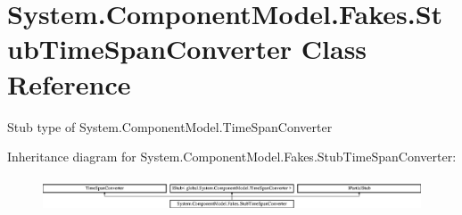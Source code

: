 \hypertarget{class_system_1_1_component_model_1_1_fakes_1_1_stub_time_span_converter}{\section{System.\-Component\-Model.\-Fakes.\-Stub\-Time\-Span\-Converter Class Reference}
\label{class_system_1_1_component_model_1_1_fakes_1_1_stub_time_span_converter}
}


Stub type of System.\-Component\-Model.\-Time\-Span\-Converter 


Inheritance diagram for System.\-Component\-Model.\-Fakes.\-Stub\-Time\-Span\-Converter\-:\begin{figure}[H]
\begin{center}
\leavevmode
\includegraphics[height=1.014493cm]{class_system_1_1_component_model_1_1_fakes_1_1_stub_time_span_converter}
\end{center}
\end{figure}
